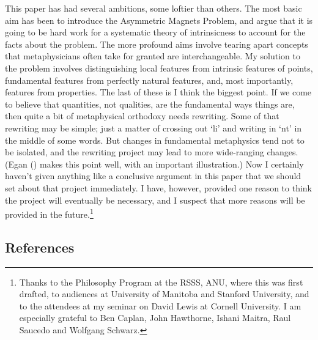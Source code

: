 \documentclass[
  10pt,
  letterpaper,
  DIV=11,
  numbers=noendperiod,
  twoside]{scrartcl}
\begin{document}
This paper has had several ambitions, some loftier than others. The most
basic aim has been to introduce the Asymmetric Magnets Problem, and
argue that it is going to be hard work for a systematic theory of
intrinsicness to account for the facts about the problem. The more
profound aims involve tearing apart concepts that metaphysicians often
take for granted are interchangeable. My solution to the problem
involves distinguishing local features from intrinsic features of
points, fundamental features from perfectly natural features, and, most
importantly, features from properties. The last of these is I think the
biggest point. If we come to believe that quantities, not qualities, are
the fundamental ways things are, then quite a bit of metaphysical
orthodoxy needs rewriting. Some of that rewriting may be simple; just a
matter of crossing out `li' and writing in `nt' in the middle of some
words. But changes in fundamental metaphysics tend not to be isolated,
and the rewriting project may lead to more wide-ranging changes. (Egan
() makes this point well, with an
important illustration.) Now I certainly haven't given anything like a
conclusive argument in this paper that we should set about that project
immediately. I have, however, provided one reason to think the project
will eventually be necessary, and I suspect that more reasons will be
provided in the future.\footnote{Thanks to the Philosophy Program at the
  RSSS, ANU, where this was first drafted, to audiences at University of
  Manitoba and Stanford University, and to the attendees at my seminar
  on David Lewis at Cornell University. I am especially grateful to Ben
  Caplan, John Hawthorne, Ishani Maitra, Raul Saucedo and Wolfgang
  Schwarz.}

\subsection*{References}\label{references}
\end{document}
